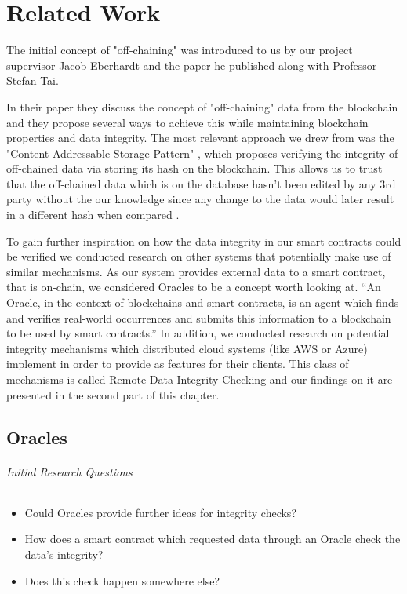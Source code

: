 \chapter{Related Work}

The initial concept of "off-chaining" was introduced to us by our project supervisor Jacob Eberhardt and the paper he published along with Professor Stefan Tai.

In their paper they discuss the concept of "off-chaining" data from the blockchain and they propose several ways to achieve this while maintaining blockchain properties and data integrity. The most relevant approach we drew from was the "Content-Addressable Storage Pattern" \cite{Eberhardt2017}, which proposes verifying the integrity of off-chained data via storing its hash on the blockchain. This allows us to trust that the off-chained data which is on the database hasn't been edited by any 3rd party without the our knowledge since any change to the data would later result in a different hash when compared \cite{Eberhardt2017}.

To gain further inspiration on how the data integrity in our smart contracts could be verified we conducted research on other systems that potentially make use of similar mechanisms. As our system provides external data to a smart contract, that is on-chain, we considered Oracles to be a concept worth looking at. “An Oracle, in the context of blockchains and smart contracts, is an agent which finds and verifies real-world occurrences and submits this information to a blockchain to be used by smart contracts.” \cite{relatedWork01} In addition, we conducted research on potential integrity mechanisms which distributed cloud systems (like AWS or Azure) implement in order to provide as features for their clients. This class of mechanisms is called Remote Data Integrity Checking and our findings on it are presented in the second part of this chapter.

\section{Oracles}

\subparagraph{Initial Research Questions}
\begin{itemize}
\item Could Oracles provide further ideas for integrity checks?
\item How does a smart contract which requested data through an Oracle check the data’s integrity?
\item Does this check happen somewhere else?
\end{itemize}


